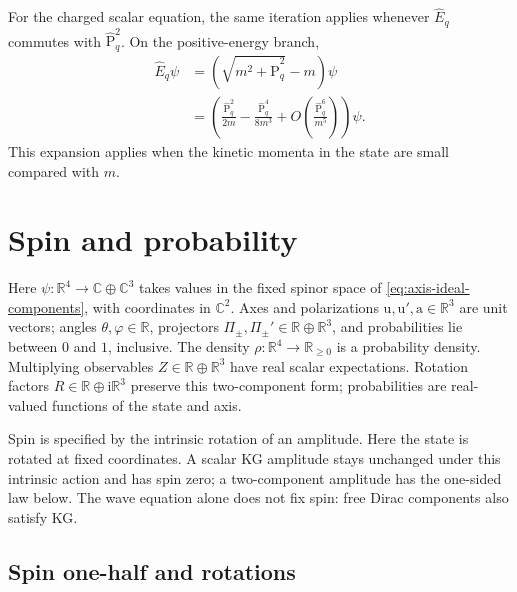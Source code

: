\documentclass[11pt]{article}
\newcommand{\pv}[1]{{#1}}
\newcommand{\pvGreek}[1]{{#1}}
\newcommand{\vstyle}[1]{{\bm{\mathrm{#1}}}}
\newcommand{\pR}{\pv{R}}
\newcommand{\pZ}{\pv{Z}}
\newcommand{\pvPi}{\pvGreek{\Pi}}
\newcommand{\pvpsi}{\pvGreek{\psi}}
\numberwithin{equation}{section}
\newcommand{\R}{\mathbb{R}}
\newcommand{\C}{\mathbb{C}}
\newcommand{\ii}{\mathrm{i}}
\newcommand{\bu}{\vstyle{u}}
\newcommand{\ba}{\vstyle{a}}
\newcommand{\bp}{\vstyle{P}}
\newcommand{\hEq}{\hat E_q}
\newcommand{\hbpq}{\hat{\bp}_q}
\begin{document}
For the charged scalar equation, the same iteration applies whenever
$\hEq$ commutes with $\hbpq^2$. On the positive-energy branch,
\[
 \begin{aligned}
 \hEq\psi
 &=\left(\sqrt{m^2+\hbpq^2}-m\right)\psi\\
 &=\left(\frac{\hbpq^2}{2m}-\frac{\hbpq^4}{8m^3}
   +O\!\left(\frac{\hbpq^6}{m^5}\right)\right)\psi.
 \end{aligned}
\]
This expansion applies when the kinetic momenta in the state are small
compared with $m$.

\section{Spin and probability}
\label{sec:spin-and-probability}
\label{sec:paravector-spin-content}

Here $\pvpsi:\R^4\to\C\oplus\C^3$ takes values in the fixed spinor space of
\eqref{eq:axis-ideal-components}, with coordinates in $\C^2$.
Axes and polarizations $\bu,\bu',\ba\in\R^3$ are unit vectors;
angles $\theta,\varphi\in\R$, projectors $\pvPi_\pm,\pvPi_\pm'\in\R\oplus\R^3$,
and probabilities lie between $0$ and $1$, inclusive.
The density $\rho:\R^4\to\R_{\ge0}$ is a probability density.
Multiplying observables $\pZ\in\R\oplus\R^3$ have real scalar
expectations. Rotation factors $\pR\in\R\oplus\ii\R^3$ preserve this
two-component form; probabilities are real-valued functions of the state and axis.

Spin is specified by the intrinsic rotation of an amplitude.  Here the state is rotated
at fixed coordinates.  A scalar KG amplitude stays unchanged
under this intrinsic action and has spin zero; a two-component amplitude
has the one-sided law below.  The wave equation alone does not fix spin:
free Dirac components also satisfy KG.

\subsection{Spin one-half and rotations}
\label{sec:spin-half}
\end{document}

